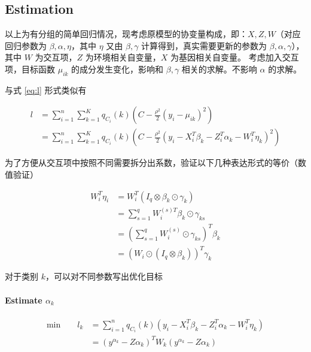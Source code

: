\documentclass[12pt, a4paper, oneside]{article}
\numberwithin{equation}{section}
\begin{document}
\subsection{Estimation}

以上为有分组的简单回归情况，现考虑原模型的协变量构成，即：$X,Z,W$（对应回归参数为 $\beta, \alpha, \eta$，其中 $\eta$ 又由 $\beta,\gamma$ 计算得到，真实需要更新的参数为 $\beta, \alpha, \gamma$），其中 $W$ 为交互项，$Z$ 为环境相关自变量，$X$ 为基因相关自变量。 
考虑加入交互项，目标函数 $\mu_{ik}$ 的成分发生变化，影响和 $\beta,\gamma$ 相关的求解。不影响 $\alpha$ 的求解。

与式 \ref{eq:l} 形式类似有

\begin{equation}
	\begin{aligned}
		l &= \displaystyle\sum_{i=1}^{n}\sum_{k=1}^{K}q_{C_i}(k)\left(C - \frac{\rho^2}{2}(y_i - \mu_{ik})^2 \right) \\
		&= \displaystyle\sum_{i=1}^{n}\sum_{k=1}^{K}q_{C_i}(k)\left(C - \frac{\rho^2}{2}(y_i - X_i^T \beta_k - Z_i^T \alpha_k - W_i^T \eta_k)^2 \right)
	\end{aligned}
\end{equation}

为了方便从交互项中按照不同需要拆分出系数，验证以下几种表达形式的等价（数值验证）

\begin{equation}
	\begin{aligned}
		W_i^T \eta_i &= W_i^T(I_q\otimes\beta_k \odot \gamma_k) \\
		&= \sum_{s=1}^{q}W_i^{(s)T}\beta_k\odot \gamma_{ks} \\
		&= (\sum_{s=1}^{q}W_i^{(s)}\odot \gamma_{ks})^T \beta_k \\
		&= (W_i \odot (I_q \otimes \beta_k))^T \gamma_k
	\end{aligned}
\label{eq:same}
\end{equation}

对于类别 $k$，可以对不同参数写出优化目标

\paragraph{Estimate $\alpha_k$}

\begin{equation}
	\begin{aligned}
		\text{min}\qquad l_k &=  \displaystyle\sum_{i=1}^{n}q_{C_i}(k)\left(y_i - X_i^T \beta_k - Z_i^T \alpha_k - W_i^T \eta_k\right) \\
		&= (y^{\alpha_k} - Z\alpha_k)^T W_k (y^{\alpha_k} - Z\alpha_k)
	\end{aligned}
\end{equation}
\end{document}
